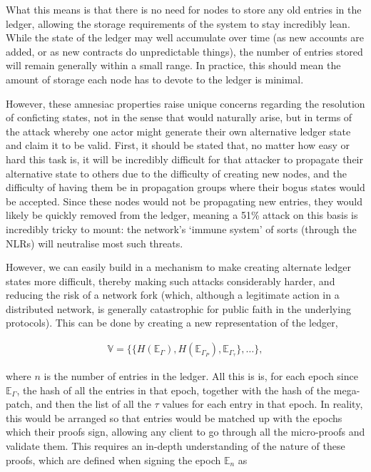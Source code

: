 \documentclass{extreport}
\begin{document}
What this means is that there is no need for nodes to store any old entries in the ledger, allowing the storage requirements of the system to stay incredibly lean. While the state of the ledger may well accumulate over time (as new accounts are added, or as new contracts do unpredictable things), the number of entries stored will remain generally within a small range. In practice, this should mean the amount of storage each node has to devote to the ledger is minimal.

However, these amnesiac properties raise unique concerns regarding the resolution of conficting states, not in the sense that would naturally arise, but in terms of the attack whereby one actor might generate their own alternative ledger state and claim it to be valid. First, it should be stated that, no matter how easy or hard this task is, it will be incredibly difficult for that attacker to propagate their alternative state to others due to the difficulty of creating new nodes, and the difficulty of having them be in propagation groups where their bogus states would be accepted. Since these nodes would not be propagating new entries, they would likely be quickly removed from the ledger, meaning a 51\% attack on this basis is incredibly tricky to mount: the network's `immune system' of sorts (through the NLRs) will neutralise most such threats.

However, we can easily build in a mechanism to make creating alternate ledger states more difficult, thereby making such attacks considerably harder, and reducing the risk of a network fork (which, although a legitimate action in a distributed network, is generally catastrophic for public faith in the underlying protocols). This can be done by creating a new representation of the ledger,

\begin{align*}
\mathbb{V} = \{ \{ H(\mathbb{E}_\Gamma), H(\mathbb{E}_{\Gamma_P}), \mathbb{E}_{\Gamma_\tau} \}, \ldots \},
\end{align*}

where \(n\) is the number of entries in the ledger. All this is is, for each epoch since \(\mathbb{E}_\Gamma\), the hash of all the entries in that epoch, together with the hash of the mega-patch, and then the list of all the \(\tau\) values for each entry in that epoch. In reality, this would be arranged so that entries would be matched up with the epochs which their proofs sign, allowing any client to go through all the micro-proofs and validate them. This requires an in-depth understanding of the nature of these proofs, which are defined when signing the epoch \(\mathbb{E}_n\) as
\end{document}
